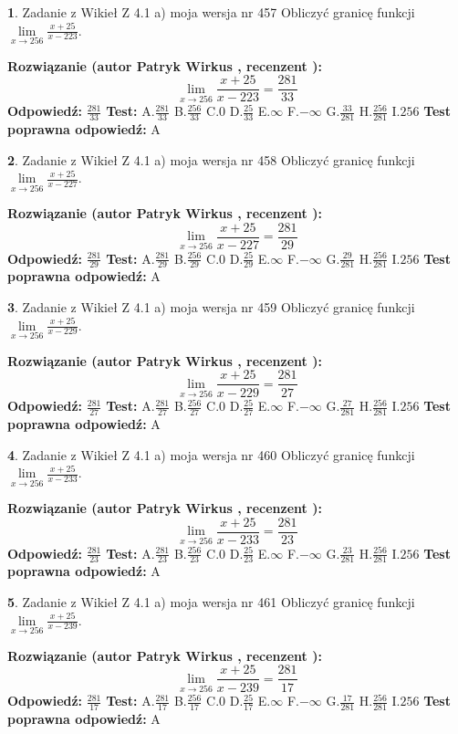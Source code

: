 \documentclass[12pt, a4paper]{article}
\theoremstyle{definition} %
\newtheorem{zad}{}
\newcommand{\zadStart}[1]{\begin{zad}#1\newline}
\newcommand{\zadStop}{\end{zad}}
\newcommand{\rozwStart}[2]{\noindent \textbf{Rozwiązanie (autor #1 , recenzent #2): }\newline}
\newcommand{\rozwStop}{\newline}
\newcommand{\odpStart}{\noindent \textbf{Odpowiedź:}\newline}
\newcommand{\odpStop}{\newline}
\newcommand{\testStart}{\noindent \textbf{Test:}\newline}
\newcommand{\testStop}{\newline}
\newcommand{\kluczStart}{\noindent \textbf{Test poprawna odpowiedź:}\newline}
\newcommand{\kluczStop}{\newline}
\begin{document}
\zadStart{Zadanie z Wikieł Z 4.1 a) moja wersja nr 457}
Obliczyć granicę funkcji $\lim\limits_{x\to256}\frac{x+25}{x-223}$.
\zadStop
\rozwStart{Patryk Wirkus}{}
$$\lim\limits_{x\to256}\frac{x+25}{x-223} = \frac{281}{33}$$
\rozwStop
\odpStart
$\frac{281}{33}$
\odpStop
\testStart
A.$\frac{281}{33}$
B.$\frac{256}{33}$
C.$0$
D.$\frac{25}{33}$
E.$\infty$
F.$-\infty$
G.$\frac{33}{281}$
H.$\frac{256}{281}$
I.$256$
\testStop
\kluczStart
A
\kluczStop



\zadStart{Zadanie z Wikieł Z 4.1 a) moja wersja nr 458}
Obliczyć granicę funkcji $\lim\limits_{x\to256}\frac{x+25}{x-227}$.
\zadStop
\rozwStart{Patryk Wirkus}{}
$$\lim\limits_{x\to256}\frac{x+25}{x-227} = \frac{281}{29}$$
\rozwStop
\odpStart
$\frac{281}{29}$
\odpStop
\testStart
A.$\frac{281}{29}$
B.$\frac{256}{29}$
C.$0$
D.$\frac{25}{29}$
E.$\infty$
F.$-\infty$
G.$\frac{29}{281}$
H.$\frac{256}{281}$
I.$256$
\testStop
\kluczStart
A
\kluczStop



\zadStart{Zadanie z Wikieł Z 4.1 a) moja wersja nr 459}
Obliczyć granicę funkcji $\lim\limits_{x\to256}\frac{x+25}{x-229}$.
\zadStop
\rozwStart{Patryk Wirkus}{}
$$\lim\limits_{x\to256}\frac{x+25}{x-229} = \frac{281}{27}$$
\rozwStop
\odpStart
$\frac{281}{27}$
\odpStop
\testStart
A.$\frac{281}{27}$
B.$\frac{256}{27}$
C.$0$
D.$\frac{25}{27}$
E.$\infty$
F.$-\infty$
G.$\frac{27}{281}$
H.$\frac{256}{281}$
I.$256$
\testStop
\kluczStart
A
\kluczStop



\zadStart{Zadanie z Wikieł Z 4.1 a) moja wersja nr 460}
Obliczyć granicę funkcji $\lim\limits_{x\to256}\frac{x+25}{x-233}$.
\zadStop
\rozwStart{Patryk Wirkus}{}
$$\lim\limits_{x\to256}\frac{x+25}{x-233} = \frac{281}{23}$$
\rozwStop
\odpStart
$\frac{281}{23}$
\odpStop
\testStart
A.$\frac{281}{23}$
B.$\frac{256}{23}$
C.$0$
D.$\frac{25}{23}$
E.$\infty$
F.$-\infty$
G.$\frac{23}{281}$
H.$\frac{256}{281}$
I.$256$
\testStop
\kluczStart
A
\kluczStop



\zadStart{Zadanie z Wikieł Z 4.1 a) moja wersja nr 461}
Obliczyć granicę funkcji $\lim\limits_{x\to256}\frac{x+25}{x-239}$.
\zadStop
\rozwStart{Patryk Wirkus}{}
$$\lim\limits_{x\to256}\frac{x+25}{x-239} = \frac{281}{17}$$
\rozwStop
\odpStart
$\frac{281}{17}$
\odpStop
\testStart
A.$\frac{281}{17}$
B.$\frac{256}{17}$
C.$0$
D.$\frac{25}{17}$
E.$\infty$
F.$-\infty$
G.$\frac{17}{281}$
H.$\frac{256}{281}$
I.$256$
\testStop
\kluczStart
A
\kluczStop
\end{document}
